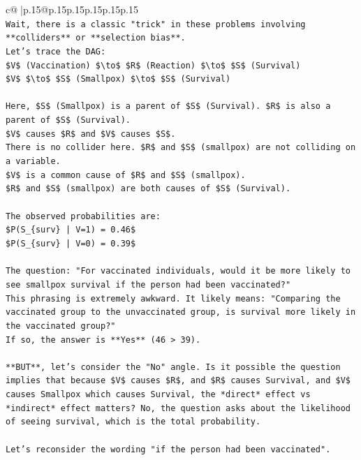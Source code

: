 \documentclass{article}
\begin{document}
{\begin{supertabular}{c@{$\;$}|p{.15\linewidth}@{}p{.15\linewidth}p{.15\linewidth}p{.15\linewidth}p{.15\linewidth}p{.15\linewidth}}
{{{\\ 
\texttt{Wait, there is a classic "trick" in these problems involving **colliders** or **selection bias**.} \\
\texttt{Let's trace the DAG:} \\
\texttt{\$V\$ (Vaccination) \$\textbackslash{}to\$ \$R\$ (Reaction) \$\textbackslash{}to\$ \$S\$ (Survival)} \\
\texttt{\$V\$ \$\textbackslash{}to\$ \$S\$ (Smallpox) \$\textbackslash{}to\$ \$S\$ (Survival)} \\
\\ 
\texttt{Here, \$S\$ (Smallpox) is a parent of \$S\$ (Survival). \$R\$ is also a parent of \$S\$ (Survival).} \\
\texttt{\$V\$ causes \$R\$ and \$V\$ causes \$S\$.} \\
\texttt{There is no collider here. \$R\$ and \$S\$ (smallpox) are not colliding on a variable.} \\
\texttt{\$V\$ is a common cause of \$R\$ and \$S\$ (smallpox).} \\
\texttt{\$R\$ and \$S\$ (smallpox) are both causes of \$S\$ (Survival).} \\
\\ 
\texttt{The observed probabilities are:} \\
\texttt{\$P(S\_\{surv\} | V=1) = 0.46\$} \\
\texttt{\$P(S\_\{surv\} | V=0) = 0.39\$} \\
\\ 
\texttt{The question: "For vaccinated individuals, would it be more likely to see smallpox survival if the person had been vaccinated?"} \\
\texttt{This phrasing is extremely awkward. It likely means: "Comparing the vaccinated group to the unvaccinated group, is survival more likely in the vaccinated group?"} \\
\texttt{If so, the answer is **Yes** (46 > 39).} \\
\\ 
\texttt{**BUT**, let's consider the "No" angle. Is it possible the question implies that because \$V\$ causes \$R\$, and \$R\$ causes Survival, and \$V\$ causes Smallpox which causes Survival, the *direct* effect vs *indirect* effect matters? No, the question asks about the likelihood of seeing survival, which is the total probability.} \\
\\ 
\texttt{Let's reconsider the wording "if the person had been vaccinated".} \\
}}}
\end{supertabular}}
\end{document}
